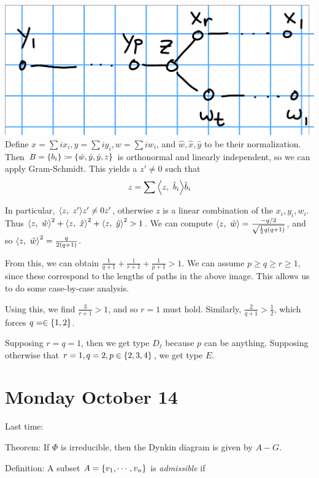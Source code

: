 \includegraphics{figures/2019-10-11-09:41.png}\\

Define \(x = \sum i x_i, y = \sum i y_i, w = \sum i w_i\), and
\(\hat w, \hat x, \hat y\) to be their normalization. Then
\(B = \left\{{b_i}\right\} \coloneqq \left\{{\hat w, \hat y, \hat y, z}\right\}\) is
orthonormal and linearly independent, so we can apply Gram-Schmidt. This
yields a \(z' \neq 0\) such that \[
z = \sum {\left\langle {z},~{\hat b_i} \right\rangle} \hat b_i
\]

In particular, \({\left\langle {z},~{z'} \right\rangle}z' \neq 0 z'\), otherwise \(z\) is a
linear combination of the \(x_i, y_i, w_i\). Thus
\({\left\langle {z},~{\hat w} \right\rangle}^2 + {\left\langle {z},~{\hat x} \right\rangle}^2 + {\left\langle {z},~{\hat y} \right\rangle}^2 > 1\).
We can compute
\({\left\langle {z},~{\hat w} \right\rangle} = \frac{-q/2}{\sqrt{\frac 1 2 q(q+1)}}\), and so
\({\left\langle {z},~{\hat w} \right\rangle}^2 = \frac q {2(q+1)}\).

From this, we can obtain
\(\frac 1 {q+1} + \frac 1 {r+1} + \frac 1 {p+1} > 1\). We can assume
\(p \geq q \geq r \geq 1\), since these correspond to the lengths of
paths in the above image. This allows us to do some case-by-case
analysis.

Using this, we find \(\frac 3 {r+1} > 1\), and so \(r=1\) must hold.
Similarly, \(\frac 2 {q+1} > \frac 1 2\), which forces
\(q = \in \left\{{1, 2}\right\}\).

Supposing \(r=q=1\), then we get type \(D_\ell\) because \(p\) can be
anything. Supposing otherwise that \(r=1, q=2, p \in \left\{{2,3,4}\right\}\),
we get type \(E\).

\hypertarget{monday-october-14}{%
\section{Monday October 14}\label{monday-october-14}}

Last time:

Theorem: If \(\Phi\) is irreducible, then the Dynkin diagram is given by
\(A-G\).

Definition: A subset \(A = \left\{{v_1, \cdots, v_n}\right\}\) is
\emph{admissible} if

